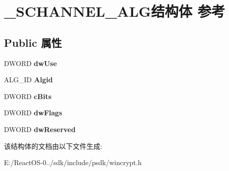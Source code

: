 \hypertarget{struct___s_c_h_a_n_n_e_l___a_l_g}{}\section{\+\_\+\+S\+C\+H\+A\+N\+N\+E\+L\+\_\+\+A\+L\+G结构体 参考}
\label{struct___s_c_h_a_n_n_e_l___a_l_g}
\subsection*{Public 属性}
\begin{DoxyCompactItemize}
\item 
\mbox{\label{struct___s_c_h_a_n_n_e_l___a_l_g_a783951c17600244ed58501466bd1004d}} 
D\+W\+O\+RD {\bfseries dw\+Use}
\item 
\mbox{\label{struct___s_c_h_a_n_n_e_l___a_l_g_af5e94e1f767aae3111adbd85eedbf9ad}} 
A\+L\+G\+\_\+\+ID {\bfseries Algid}
\item 
\mbox{\label{struct___s_c_h_a_n_n_e_l___a_l_g_a0a32149746931a7a15496b49e3abd650}} 
D\+W\+O\+RD {\bfseries c\+Bits}
\item 
\mbox{\label{struct___s_c_h_a_n_n_e_l___a_l_g_adc8115668c7a1a339a743160dc359491}} 
D\+W\+O\+RD {\bfseries dw\+Flags}
\item 
\mbox{\label{struct___s_c_h_a_n_n_e_l___a_l_g_a7de6fb3fd6375968f5fb7333d3ffc2ff}} 
D\+W\+O\+RD {\bfseries dw\+Reserved}
\end{DoxyCompactItemize}


该结构体的文档由以下文件生成\+:\begin{DoxyCompactItemize}
\item 
E\+:/\+React\+O\+S-\/0../sdk/include/psdk/wincrypt.\+h\end{DoxyCompactItemize}
